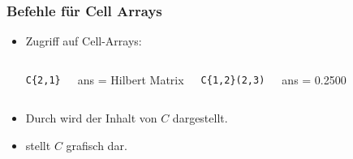 \documentclass[hyperref={xetex}]{beamer}
\begin{document}
\begin{frame}[fragile]\frametitle{Befehle für Cell Arrays}
\begin{itemize}
\item Zugriff auf Cell-Arrays:\\ 
\begin{columns}[c]
\begin{lstlisting} 
C{2,1}
\end{lstlisting}
\begin{matlab}
ans =
Hilbert Matrix
\end{matlab}
\begin{lstlisting}
C{1,2}(2,3)
\end{lstlisting}
\begin{matlab}
ans =
    0.2500
\end{matlab}
\end{columns}
\item Durch  wird der Inhalt von $C$ dargestellt.
\item {} stellt $C$ grafisch dar.
\end{itemize}
\end{frame}
\end{document}
